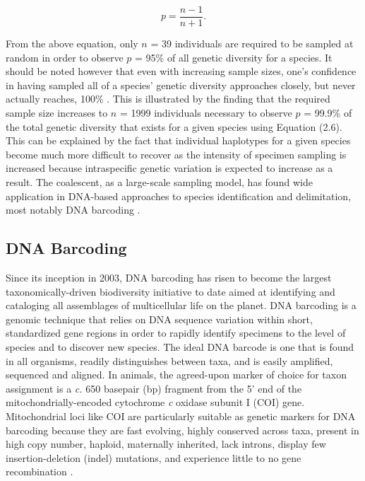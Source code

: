 \begin{equation}
p = \frac{n - 1}{n + 1}.
\end{equation}

\vspace{5mm}

\noindent From the above equation, only $n$ = 39 individuals are required to be sampled at random in order to observe $p$ = 95\% of all genetic diversity for a species. It should be noted however that even with increasing sample sizes, one's confidence in having sampled all of a species’ genetic diversity approaches closely, but never actually reaches, 100\% \cite{austerlitz2009dna}. This is illustrated by the finding that the required sample size increases to $n$ = 1999 individuals necessary to observe $p$ = 99.9\% of the total genetic diversity that exists for a given species using Equation (2.6). This can be explained by the fact that individual haplotypes for a given species become much more difficult to recover as the intensity of specimen sampling is increased because intraspecific genetic variation is expected to increase as a result. The coalescent, as a large-scale sampling model, has found wide application in DNA-based approaches to species identification and delimitation, most notably DNA barcoding \cite{hubert2015dna}.

\vspace{5mm}

\subsection{DNA Barcoding}

Since its inception in 2003, DNA barcoding \cite{hebert2003biological} has risen to become the largest \\ taxonomically-driven biodiversity initiative to date aimed at identifying and cataloging all assemblages of multicellular life on the planet. DNA barcoding is a genomic technique that relies on DNA sequence variation within short, standardized gene regions in order to rapidly identify specimens to the level of species and to discover new species. The ideal DNA barcode is one that is found in all organisms, readily distinguishes between taxa, and is easily amplified, sequenced and aligned. In animals, the agreed-upon marker of choice for taxon assignment is a \textit{c.} 650 basepair (bp) fragment from the 5' end of the mitochondrially-encoded cytochrome \textit{c} oxidase subunit I (COI) gene. Mitochondrial loci like COI are particularly suitable as genetic markers for DNA barcoding because they are fast evolving, highly conserved across taxa, present in high copy number, haploid, maternally inherited, lack introns, display few insertion-deletion (indel) mutations, and experience little to no gene recombination \cite{hebert2003biological, hebert2003barcoding}.

